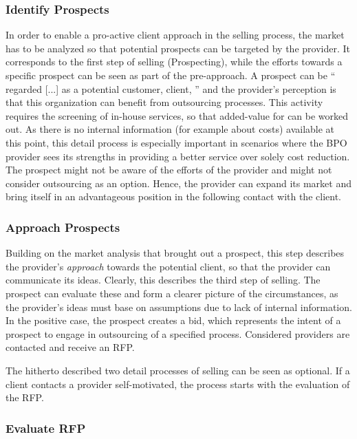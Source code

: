 	\subsubsection{Identify Prospects}
	In order to enable a pro-active client approach in the selling process, the market has to be analyzed so that potential prospects can be targeted by the provider. It corresponds to the first step of selling (Prospecting), while the efforts towards a specific prospect can be seen as part of the pre-approach. 
	A prospect can be \enquote{ regarded [...] as a potential customer, client, \etc} \citep{oxfordprospect} and the provider's perception is that this organization can benefit from outsourcing processes. This activity requires the screening of in-house services, so that added-value for can be worked out. As there is no internal information (for example about costs) available at this point, this detail process is especially important in scenarios where the \acrshort{BPO} provider sees its strengths in providing a better service over solely cost reduction. The prospect might not be aware of the efforts of the provider and might not consider outsourcing as an option. Hence, the provider can expand its market and bring itself in an advantageous position in the following contact with the client. 
	
	
	\subsubsection{Approach Prospects}
	
	Building on the market analysis that brought out a prospect, this step describes the provider's \textit{approach} towards the potential client, so that the provider can communicate its ideas. Clearly, this describes the third step of selling. The prospect can evaluate these and form a clearer picture of the circumstances, as the provider's ideas must base on assumptions due to lack of internal information. In the positive case, the prospect creates a bid, which represents the intent of a prospect to engage in outsourcing of a specified process. Considered providers are contacted and receive an \acrshort{RFP}. 
	
	The hitherto described two detail processes of selling can be seen as optional. If a client contacts a provider self-motivated, the process starts with the evaluation of the \acrshort{RFP}.
	
	\subsubsection{Evaluate \acrshort{RFP}}
	
